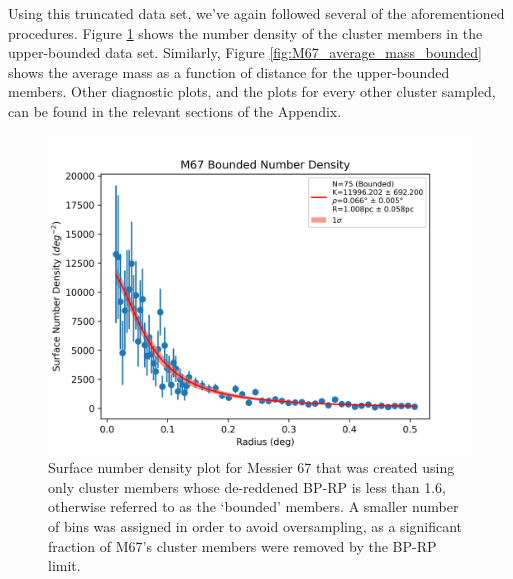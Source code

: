\documentclass[onecolumn,table,xcdraw,super]{aastex631}
\begin{document}
Using this truncated data set, we've again followed several of the aforementioned procedures. Figure \ref{fig:M67_num_density_bounded} shows the number density of the cluster members in the upper-bounded data set. Similarly, Figure \ref{fig:M67_average_mass_bounded} shows the average mass as a function of distance for the upper-bounded members. Other diagnostic plots, and the plots for every other cluster sampled, can be found in the relevant sections of the Appendix.

\begin{figure}[]
    \centering
      \includegraphics[width=4.75in]{figures/M67_numDensity_bounded.png}
    \caption{Surface number density plot for Messier 67 that was created using only cluster members whose de-reddened BP-RP is less than 1.6, otherwise referred to as the `bounded' members. A smaller number of bins was assigned in order to avoid oversampling, as a significant fraction of M67's cluster members were removed by the BP-RP limit.}
    \label{fig:M67_num_density_bounded}
\end{figure}
\end{document}
